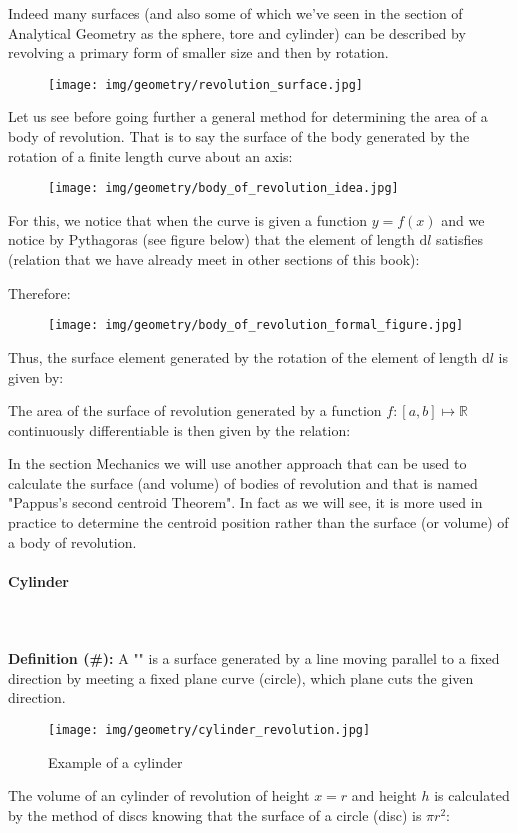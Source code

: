 {	Indeed many surfaces (and also some of which we've seen in the section of Analytical Geometry as the sphere, tore and cylinder) can be described by revolving a primary form of smaller size and then by rotation.
	\begin{figure}[H]
		\centering
		\texttt{[image: img/geometry/revolution\_surface.jpg]}
	\end{figure}
	Let us see before going further a general method for determining the area of a body of revolution. That is to say the surface of the body generated by the rotation of a finite length curve about an axis:
	\begin{figure}[H]
		\centering
		\texttt{[image: img/geometry/body\_of\_revolution\_idea.jpg]}
	\end{figure}
	For this, we notice that when the curve is given a function $y=f(x) $ and we notice by Pythagoras (see figure below) that the element of length $\mathrm{d}l$ satisfies (relation that we have already meet in other sections of this book):
	
	Therefore:
	
	\begin{figure}[H]
		\centering
		\texttt{[image: img/geometry/body\_of\_revolution\_formal\_figure.jpg]}
	\end{figure}
	Thus, the surface element generated by the rotation of the element of length $\mathrm{d}l$ is given by:
	
	The area of the surface of revolution generated by a function $f:[a,b]\mapsto \mathbb{R}$ continuously differentiable  is then given by the relation:
	
	\begin{tcolorbox}[title=Remark,colframe=black,arc=10pt]
	In the section Mechanics we will use another approach that can be used to calculate the surface (and volume) of bodies of revolution and that is named "Pappus's second centroid Theorem". In fact as we will see, it is more used in practice to determine the centroid position rather than the surface (or volume) of a body of revolution.
	\end{tcolorbox}
	
	\pagebreak
	\paragraph{Cylinder}\label{cylinder}\mbox{}\\\\
	\textbf{Definition (\#\mydef):} A "" is a surface generated by a line moving parallel to a fixed direction by meeting a fixed plane curve (circle), which plane cuts the given direction.
	\begin{figure}[H]
		\centering
		\texttt{[image: img/geometry/cylinder\_revolution.jpg]}
		\caption{Example of a cylinder}
	\end{figure}
	The volume of an cylinder of revolution of height $x=r$ and height $h$ is calculated by the method of discs knowing that the surface of a circle (disc) is $\pi r^2$:
	
}
